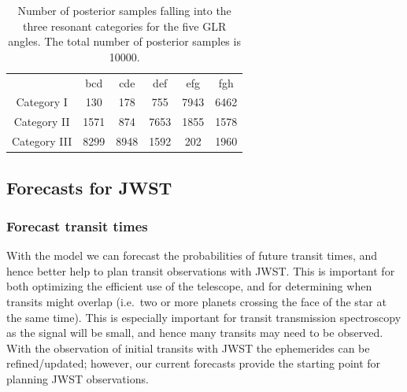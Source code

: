 \documentclass[fleqn,usenatbib]{mnras} %
\begin{document}
\begin{table}
\centering
\begin{tabular}{|c|c c c c c} 
  &                   bcd     & cde   & def   & efg   & fgh \\
 Category I         & 130     & 178   & 755   & 7943  & 6462 \\
 Category II        & 1571    & 874   & 7653  & 1855  & 1578 \\
 Category III       & 8299    & 8948  & 1592  & 202   & 1960

\end{tabular}
\caption{Number of posterior samples falling into the three resonant categories for the five GLR angles. The total number of posterior samples is 10000.}
\label{tab:cat}
\end{table}




\subsection{Forecasts for JWST}

%


\subsubsection{Forecast transit times}

With the model we can forecast the probabilities of future transit times,
and hence better help to plan transit observations with JWST.  This is
important for both optimizing the efficient use of the telescope, and for
determining when transits might overlap (i.e.\ two or more planets crossing the face
of the star at the same time).  This is especially important for transit
transmission spectroscopy as the signal will be small, and hence many 
transits may need to be observed.  With the observation of initial transits
with JWST the ephemerides can be refined/updated;  however, our current
forecasts provide the starting point for planning JWST observations.
\end{document}
